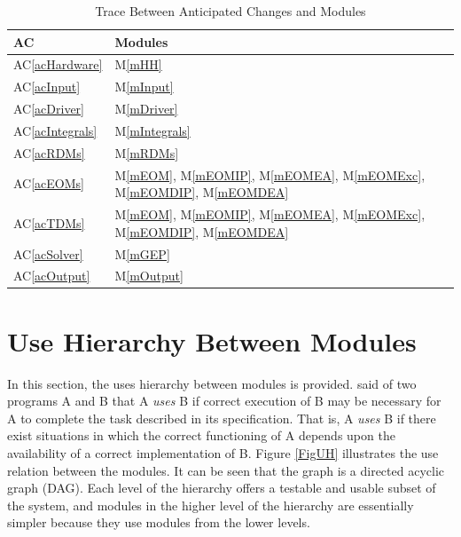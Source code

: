 \documentclass[12pt, titlepage]{article}
\newcommand{\acref}[1]{AC\ref{#1}}
\newcommand{\mref}[1]{M\ref{#1}}
\begin{document}
\begin{table}[H]
\centering
\begin{tabular}{p{} p{}}
\toprule
\textbf{AC} & \textbf{Modules}\\
\midrule
\acref{acHardware} & \mref{mHH}\\
\acref{acInput} & \mref{mInput}\\
\acref{acDriver} & \mref{mDriver}\\
\acref{acIntegrals} & \mref{mIntegrals}\\
\acref{acRDMs} & \mref{mRDMs}\\
\acref{acEOMs} & \mref{mEOM}, \mref{mEOMIP}, \mref{mEOMEA}, \mref{mEOMExc}, 
\mref{mEOMDIP}, \mref{mEOMDEA}\\
\acref{acTDMs} & \mref{mEOM}, \mref{mEOMIP}, \mref{mEOMEA}, \mref{mEOMExc}, 
\mref{mEOMDIP}, \mref{mEOMDEA}\\
\acref{acSolver} & \mref{mGEP}\\
\acref{acOutput} & \mref{mOutput}\\
\bottomrule
\end{tabular}
\caption{Trace Between Anticipated Changes and Modules}
\label{TblACT}
\end{table}

\section{Use Hierarchy Between Modules} \label{SecUse}

In this section, the uses hierarchy between modules is
provided. \citet{Parnas1978} said of two programs A and B that A {\em uses} B if
correct execution of B may be necessary for A to complete the task described in
its specification. That is, A {\em uses} B if there exist situations in which
the correct functioning of A depends upon the availability of a correct
implementation of B.  Figure \ref{FigUH} illustrates the use relation between
the modules. It can be seen that the graph is a directed acyclic graph
(DAG). Each level of the hierarchy offers a testable and usable subset of the
system, and modules in the higher level of the hierarchy are essentially simpler
because they use modules from the lower levels.
\end{document}
